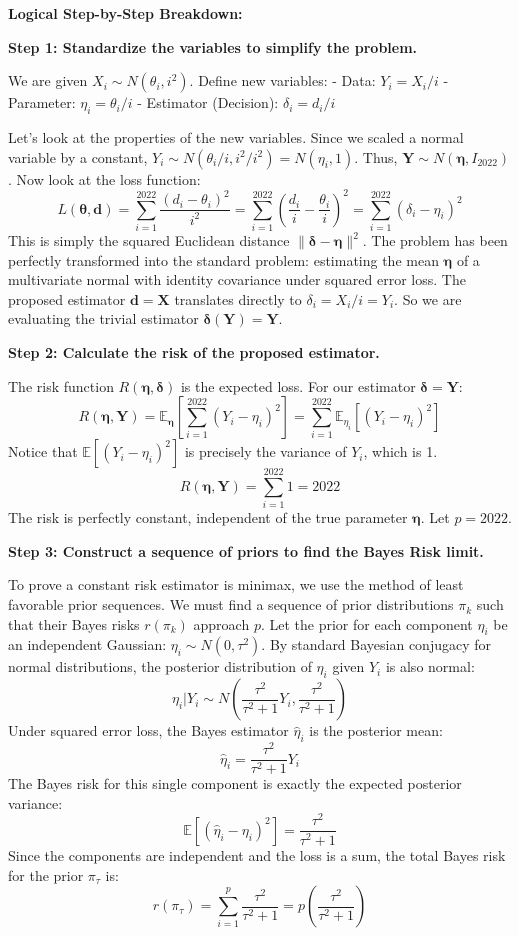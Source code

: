 \begin{solution}
\textbf{Logical Step-by-Step Breakdown:}

\textbf{Step 1: Standardize the variables to simplify the problem.}

We are given $X_i \sim N(\theta_i, i^2)$.
Define new variables:
- Data: $Y_i = X_i / i$
- Parameter: $\eta_i = \theta_i / i$
- Estimator (Decision): $\delta_i = d_i / i$

Let's look at the properties of the new variables. Since we scaled a normal variable by a constant, $Y_i \sim N(\theta_i/i, i^2/i^2) = N(\eta_i, 1)$. Thus, $\mathbf{Y} \sim N(\boldsymbol{\eta}, I_{2022})$.
Now look at the loss function:
\[ L(\boldsymbol{\theta}, \mathbf{d}) = \sum_{i=1}^{2022} \frac{(d_i - \theta_i)^2}{i^2} = \sum_{i=1}^{2022} \left( \frac{d_i}{i} - \frac{\theta_i}{i} \right)^2 = \sum_{i=1}^{2022} (\delta_i - \eta_i)^2 \]
This is simply the squared Euclidean distance $\|\boldsymbol{\delta} - \boldsymbol{\eta}\|^2$.
The problem has been perfectly transformed into the standard problem: estimating the mean $\boldsymbol{\eta}$ of a multivariate normal with identity covariance under squared error loss.
The proposed estimator $\mathbf{d} = \mathbf{X}$ translates directly to $\delta_i = X_i/i = Y_i$. So we are evaluating the trivial estimator $\boldsymbol{\delta}(\mathbf{Y}) = \mathbf{Y}$.

\textbf{Step 2: Calculate the risk of the proposed estimator.}

The risk function $R(\boldsymbol{\eta}, \boldsymbol{\delta})$ is the expected loss. For our estimator $\boldsymbol{\delta} = \mathbf{Y}$:
\[ R(\boldsymbol{\eta}, \mathbf{Y}) = \mathbb{E}_{\boldsymbol{\eta}} \left[ \sum_{i=1}^{2022} (Y_i - \eta_i)^2 \right] = \sum_{i=1}^{2022} \mathbb{E}_{\eta_i} [ (Y_i - \eta_i)^2 ] \]
Notice that $\mathbb{E}[(Y_i - \eta_i)^2]$ is precisely the variance of $Y_i$, which is 1.
\[ R(\boldsymbol{\eta}, \mathbf{Y}) = \sum_{i=1}^{2022} 1 = 2022 \]
The risk is perfectly constant, independent of the true parameter $\boldsymbol{\eta}$. Let $p = 2022$.

\textbf{Step 3: Construct a sequence of priors to find the Bayes Risk limit.}

To prove a constant risk estimator is minimax, we use the method of least favorable prior sequences. We must find a sequence of prior distributions $\pi_k$ such that their Bayes risks $r(\pi_k)$ approach $p$.
Let the prior for each component $\eta_i$ be an independent Gaussian: $\eta_i \sim N(0, \tau^2)$.
By standard Bayesian conjugacy for normal distributions, the posterior distribution of $\eta_i$ given $Y_i$ is also normal:
\[ \eta_i | Y_i \sim N\left( \frac{\tau^2}{\tau^2 + 1} Y_i, \frac{\tau^2}{\tau^2 + 1} \right) \]
Under squared error loss, the Bayes estimator $\hat{\eta}_i$ is the posterior mean:
\[ \hat{\eta}_i = \frac{\tau^2}{\tau^2 + 1} Y_i \]
The Bayes risk for this single component is exactly the expected posterior variance:
\[ \mathbb{E}\left[ (\hat{\eta}_i - \eta_i)^2 \right] = \frac{\tau^2}{\tau^2 + 1} \]
Since the components are independent and the loss is a sum, the total Bayes risk for the prior $\pi_\tau$ is:
\[ r(\pi_\tau) = \sum_{i=1}^p \frac{\tau^2}{\tau^2 + 1} = p \left( \frac{\tau^2}{\tau^2 + 1} \right) \]


\end{solution}
